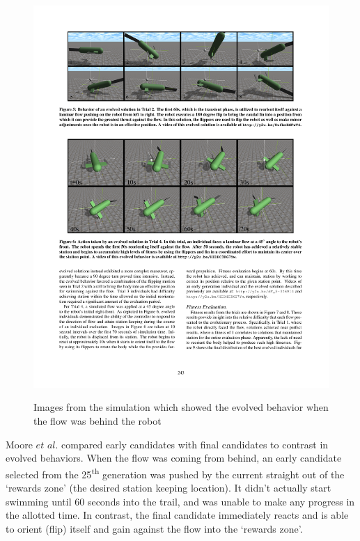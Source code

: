 \documentclass{sig-alternate}
\begin{document}
\begin{figure}%
\center
\caption{Images from the simulation which showed the evolved behavior when the flow was behind the robot}

  \includegraphics[scale=1]{sr1}
\label{fig:robot flip}
\end{figure}

  Moore $et$ $al.$ compared early candidates with final candidates to contrast in evolved behaviors. When the flow was coming from behind, an early candidate selected from the 25\textsuperscript{th} generation was pushed by the current straight out of the `rewards zone' (the desired station keeping location). It didn't actually start swimming until 60 seconds into the trail, and was unable to make any progress in the allotted time. In contrast, the final candidate immediately reacts and is able to orient (flip) itself and gain against the flow into the `rewards zone'. 
\end{document}

